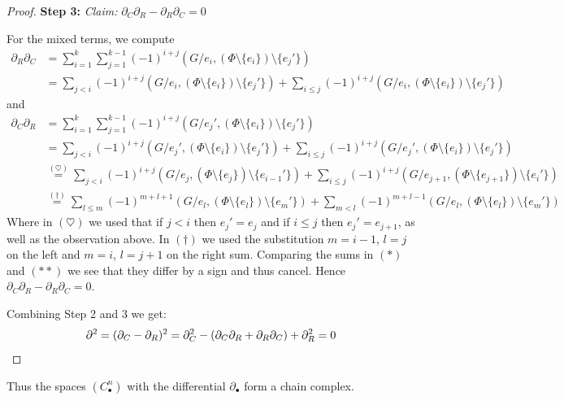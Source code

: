 \begin{proof}
	\textbf{Step 3:} \emph{Claim:} $\partial_{C} \partial_{R} - \partial_{R} \partial_{C} = 0$

	For the mixed terms, we compute
	\begin{align*}
		\partial_{R} \partial_{C} &=  \sum_{i=1}^{k} \sum_{j=1}^{k-1} (-1)^{i+j}(G / e_{i}, (\Phi \setminus \{e_{i}\} ) \setminus \{e_{j}'\})  \\
					   &= \sum_{j < i} (-1)^{i+j} (G / e_{i}, (\Phi \setminus \{e_{i}\} ) \setminus \{e_{j}'\}) + \sum_{i \leq j} (-1)^{i+j}
					   (G / e_{i}, (\Phi \setminus \{e_{i}\} ) \setminus \{e_{j}'\}) \tag{$*$}
	\end{align*}
	and
	\begin{align*}
		\partial_{C} \partial_{R} &=  \sum_{i=1}^{k} \sum_{j=1}^{k-1} (-1)^{i+j}(G / e_{j}', (\Phi \setminus \{e_{i}\} ) \setminus \{e_{j}'\})  \\
					   &= \sum_{j < i} (-1)^{i+j} (G / e_{j}', (\Phi \setminus \{e_{i}\} ) \setminus \{e_{j}'\}) + \sum_{i \leq j} (-1)^{i+j}
					   (G / e_{j}', (\Phi \setminus \{e_{i}\} ) \setminus \{e_{j}'\}) \\
					   &\stackrel{(\heartsuit)}{=} \sum_{j < i} (-1)^{i+j} (G / e_{j}, (\Phi \setminus \{e_{j}\} ) \setminus \{e_{i-1}'\}) + \sum_{i \leq j} (-1)^{i+j}
					   (G / e_{j+1}, (\Phi \setminus \{e_{j+1}\} ) \setminus \{e_{i}'\}) \\
					   &\stackrel{(\dagger)}{=} \sum_{l \leq m} (-1)^{m+l+1} (G / e_{l}, (\Phi \setminus \{e_{l}\} ) \setminus \{e_{m}'\}) + \sum_{m < l} (-1)^{m+l-1}
					   (G / e_{l}, (\Phi \setminus \{e_{l}\} ) \setminus \{e_{m}'\}) \tag{$* *$}
	\end{align*}
	Where in $(\heartsuit)$ we used that if $j < i$ then $e_{j}' = e_{j}$ and if $i \leq j$ then $e_{j}' = e_{j+1}$, as well as the observation above.
	In $(\dagger)$ we used the substitution  $m = i-1$,  $l = j$ on the left and  $m = i$,  $l = j+1$ on the right sum.
	Comparing the sums in $(*)$ and $(* *)$ we see that they differ by a sign and thus cancel. Hence  $\partial_{C} \partial_{R} - \partial_{R} \partial_{C} = 0$.

	Combining Step 2 and 3 we get:
	\[
		\partial^2 = (\partial_{C} - \partial_{R})^2 = \partial_{C}^2 - (\partial_{C} \partial_{R} + \partial_{R} \partial_{C}) + \partial_{R}^2 = 0\qedhere
	\]
\end{proof}

Thus the spaces $(C^{n}_{\bullet})$ with the differential $\partial_{\bullet}$ form a chain complex.

